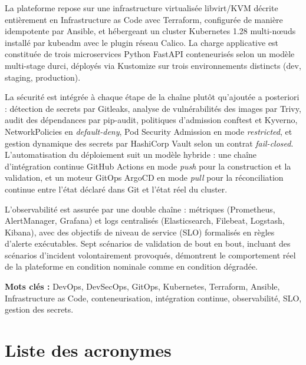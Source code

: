 \documentclass[12pt,a4paper,oneside]{report}
\makeatletter
\def\cleardoublepage{\clearpage\if@twoside
  \ifodd\c@page\else\hbox{}\thispagestyle{empty}\newpage\fi\fi}
\makeatother
\begin{document}
La plateforme repose sur une infrastructure virtualisée libvirt/KVM décrite entièrement
en Infrastructure as Code avec Terraform, configurée de manière idempotente par Ansible,
et hébergeant un cluster Kubernetes 1.28 multi-n\oe uds installé par kubeadm avec le
plugin réseau Calico. La charge applicative est constituée de trois microservices
Python FastAPI conteneurisés selon un modèle multi-stage durci, déployés via Kustomize
sur trois environnements distincts (dev, staging, production).

La sécurité est intégrée à chaque étape de la chaîne plutôt qu'ajoutée a posteriori :
détection de secrets par Gitleaks, analyse de vulnérabilités des images par Trivy,
audit des dépendances par pip-audit, politiques d'admission conftest et Kyverno,
NetworkPolicies en \emph{default-deny}, Pod Security Admission en mode \emph{restricted},
et gestion dynamique des secrets par HashiCorp Vault selon un contrat \emph{fail-closed}.
L'automatisation du déploiement suit un modèle hybride : une chaîne d'intégration
continue GitHub Actions en mode \emph{push} pour la construction et la validation, et
un moteur GitOps ArgoCD en mode \emph{pull} pour la réconciliation continue entre l'état
déclaré dans Git et l'état réel du cluster.

L'observabilité est assurée par une double chaîne : métriques (Prometheus, AlertManager,
Grafana) et logs centralisés (Elasticsearch, Filebeat, Logstash, Kibana), avec des
objectifs de niveau de service (SLO) formalisés en règles d'alerte exécutables.
Sept scénarios de validation de bout en bout, incluant des scénarios d'incident
volontairement provoqués, démontrent le comportement réel de la plateforme en
condition nominale comme en condition dégradée.

\vspace{0.6cm}
\noindent\textbf{Mots clés :} DevOps, DevSecOps, GitOps, Kubernetes, Terraform, Ansible,
Infrastructure as Code, conteneurisation, intégration continue, observabilité, SLO,
gestion des secrets.

\cleardoublepage

\tableofcontents
\clearpage

\chapter*{Liste des acronymes}
\end{document}
